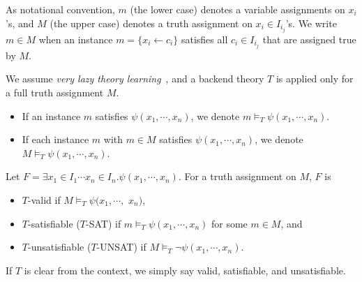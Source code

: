 \documentclass[runningheads,a4paper,oribibl]{llncs}
\newcommand{\suppress}[1]{} %
\begin{document}
As notational convention, $m$ (the lower case) denotes 
a variable assignments on $x_i$'s, and 
$M$ (the upper case) denotes a truth assignment on $x_i \in I_{i_j}$'s. 
We write $m \in M$ when an instance $m = \{ x_i \leftarrow c_i \}$ satisfies 
all $c_i \in I_{i_j}$ that are assigned true by $M$. 

We assume {\em very lazy theory learning}~\cite{dpll}, and 
a backend theory $T$ is applied only for a full truth assignment $M$. 
\begin{itemize}
\item If an instance $m$ satisfies $\psi(x_1,\cdots,x_n)$, we denote $m \models_T \psi(x_1,\cdots,x_n)$. 
\item If each instance $m$ with $m \in M$ satisfies $\psi(x_1,\cdots,x_n)$, 
we denote $M \models_T \psi(x_1,\cdots,x_n)$. 
\end{itemize}

\begin{definition} \label{def:app}
Let $F = \exists x_1 \in I_1 \cdots x_n \in I_n. \psi(x_1,\cdots,x_n)$. 
For a truth assignment on $M$, $F$ is 
\begin{itemize}
\item $T$-valid if $M \models_T \psi(x_1,\cdots,$ $x_n)$, 
\item $T$-satisfiable ($T$-SAT) if $m \models_T \psi(x_1,\cdots,x_n)$ 
for some $m \in M$, and 
\item $T$-unsatisfiable ($T$-UNSAT) if $M \models_T \neg \psi(x_1,\cdots,x_n)$. 
\end{itemize}
If $T$ is clear from the context, we simply say valid, satisfiable, and unsatisfiable. 
\end{definition}

\suppress{
Then, Fig. \ref{fig:T_result} illustrates Definition~\ref{def:app}. 
\begin{figure} [ht]
\centering
\begin{minipage}[b]{0.45\linewidth}
  \texttt{[image: T\_result.eps]}
\caption{Results of a target constraint $F$ in a theory $T$}
\label{fig:T_result}
\end{minipage}
\quad
\begin{minipage}[b]{0.45\linewidth}
   \texttt{[image: frame\_app.eps]}
\caption{{\bf raSAT} loop}
\label{fig:frame}
\end{minipage}
\end{figure}
}
\end{document}
